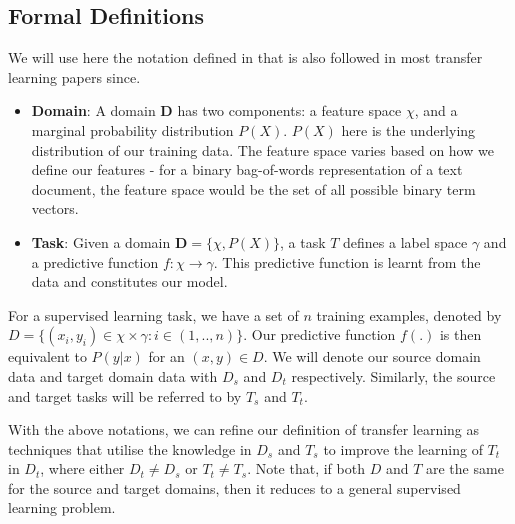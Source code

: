 \documentclass[12pt]{report}
\begin{document}
	\subsection{Formal Definitions}
	We will use here the notation defined in \citep{pan2010survey} that is also followed in most transfer learning papers since.
	\begin{itemize}
		\item \textbf{Domain}: A domain $\textbf{D}$ has two components: a feature space $\chi$, and a marginal probability distribution $P(X)$. $P(X)$ here is the underlying distribution of our training data. The feature space varies based on how we define our features - for a binary bag-of-words representation of a text document, the feature space would be the set of all possible binary term vectors.
		\item \textbf{Task}: Given a domain $\textbf{D} = \{\chi, P(X)\}$, a task $T$ defines a label space $\gamma$ and a predictive function $f: \chi \rightarrow \gamma$. This predictive function is learnt from the data and constitutes our model. 
	\end{itemize}
	For a supervised learning task, we have a set of $n$ training examples, denoted by $D = \{(x_{i}, y_{i}) \in \chi \times \gamma: i \in (1,..,n)\}$. Our predictive function $f(.)$ is then equivalent to $P(y|x)$ for an $(x,y) \in D$. We will denote our source domain data and target domain data with $D_{s}$ and $D_{t}$ respectively. Similarly, the source and target tasks will be referred to by $T_{s}$ and $T_{t}$.
	\par With the above notations, we can refine our definition of transfer learning as techniques that utilise the knowledge in $D_{s}$ and $T_{s}$ to improve the learning of $T_{t}$ in $D_{t}$, where either $D_{t} \neq D_{s}$ or $T_{t} \neq T_{s}$. Note that, if both $D$ and $T$ are the same for the source and target domains, then it reduces to a general supervised learning problem.
	
	
\end{document}
